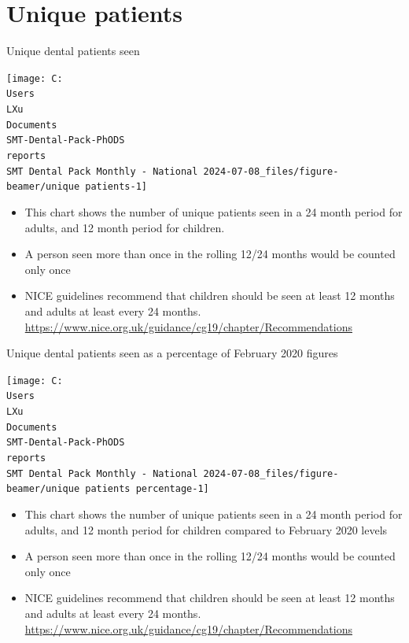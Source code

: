 \documentclass[
  8pt,
  ignorenonframetext,
  aspectratio = 169]{beamer}
\providecommand{\tightlist}{%
  \setlength{\itemsep}{0pt}\setlength{\parskip}{0pt}}
\begin{document}
\hypertarget{unique-patients}{%
\section{Unique patients}\label{unique-patients}}

\begin{frame}{Unique dental patients seen}
\protect\hypertarget{unique-dental-patients-seen}{}
\begin{center}\texttt{[image: C:\\Users\\LXu\\Documents\\SMT-Dental-Pack-PhODS\\reports\\SMT Dental Pack Monthly - National 2024-07-08\_files/figure-beamer/unique patients-1]} \end{center}

\begin{itemize}
\tightlist
\item
  This chart shows the number of unique patients seen in a 24 month
  period for adults, and 12 month period for children.
\item
  A person seen more than once in the rolling 12/24 months would be
  counted only once
\item
  NICE guidelines recommend that children should be seen at least 12
  months and adults at least every 24 months.
  \url{https://www.nice.org.uk/guidance/cg19/chapter/Recommendations}
\end{itemize}
\end{frame}

\begin{frame}{Unique dental patients seen as a percentage of February
2020 figures}
\protect\hypertarget{unique-dental-patients-seen-as-a-percentage-of-february-2020-figures}{}
\begin{center}\texttt{[image: C:\\Users\\LXu\\Documents\\SMT-Dental-Pack-PhODS\\reports\\SMT Dental Pack Monthly - National 2024-07-08\_files/figure-beamer/unique patients percentage-1]} \end{center}

\begin{itemize}
\tightlist
\item
  This chart shows the number of unique patients seen in a 24 month
  period for adults, and 12 month period for children compared to
  February 2020 levels
\item
  A person seen more than once in the rolling 12/24 months would be
  counted only once
\item
  NICE guidelines recommend that children should be seen at least 12
  months and adults at least every 24 months.
  \url{https://www.nice.org.uk/guidance/cg19/chapter/Recommendations}
\end{itemize}
\end{frame}
\end{document}
